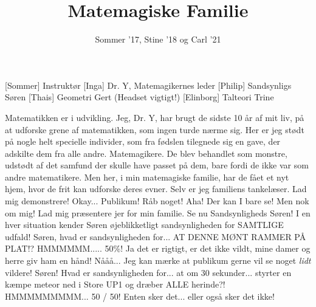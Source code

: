 \documentclass[a4paper,11pt]{article}
\title{Matemagiske Familie}
\author{Sommer '17, Stine '18 og Carl '21}
\begin{document}
\maketitle

\begin{roles}
[Sommer] Instruktør
[Inga] Dr. Y, Matemagikernes leder
[Philip] Sandsynligs Søren
[Thais] Geometri Gert (Headset vigtigt!)
[Elinborg] Talteori Trine
\end{roles}

\begin{sketch}
 Matematikken er i udvikling. Jeg, Dr. Y, har brugt de sidste 10 år af mit liv, på at udforske grene af matematikken, som ingen turde nærme sig. Her er jeg stødt på nogle helt specielle individer, som fra fødslen tilegnede sig en gave, der adskilte dem fra alle andre.  Matemagikere. De blev behandlet som monstre, udstødt af det samfund der skulle have passet på dem, bare fordi de ikke var som andre matematikere. Men her, i min matemagiske familie, har de fået et nyt hjem, hvor de frit kan udforske deres evner. Selv er jeg familiens tankelæser. Lad mig demonstrere!
 Okay... Publikum! Råb noget!
 Aha!  Der kan I bare se! Men nok om mig! Lad mig præsentere jer for min familie. Se nu Sandsynligheds Søren!
 I en hver situation kender Søren øjeblikketligt sandsynligheden for SAMTLIGE udfald!  Søren, hvad er sandsynligheden for...  AT DENNE MØNT RAMMER PÅ PLAT!?
  HMMMMMM..... 50\%!
 Ja det er rigtigt, er det ikke vildt, mine damer og herre giv ham en hånd!
 Nååå... Jeg kan mærke at publikum gerne vil se noget \textit{lidt} vildere! Søren! Hvad er sandsynligheden for... at om 30 sekunder... styrter  en kæmpe meteor ned i Store UP1 og dræber ALLE herinde?!
 HMMMMMMMMM... 50 / 50! Enten sker det... eller også sker det ikke!

\end{sketch}
\end{document}
